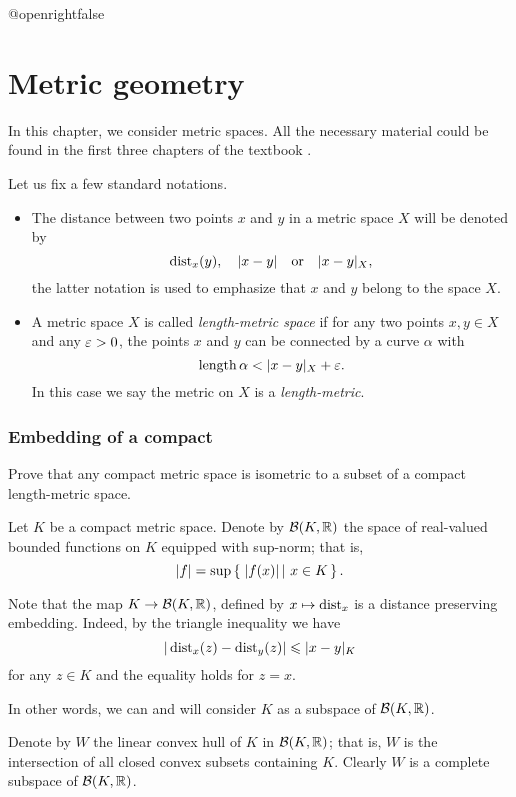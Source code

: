 \csname @openrightfalse\endcsname
\chapter{Metric geometry}

In this chapter, we consider metric spaces.
All the necessary material could be found in the first three chapters of the textbook \cite{bbi}. 

Let us fix a few standard notations.
\begin{itemize}
\item The distance between two points $x$ and $y$ in a metric space $X$
will be denoted by 
\[\operatorname{\rm dist}\nolimits_x(y),
\quad
|x-y|
\quad\text{or}\quad
|x-y|_X,
\]
the latter notation is used to emphasize that $x$ and $y$ belong to the space $X$.
\item A metric space $X$ is called {}\emph{length-metric space} if for any two points $x,y\in X$ and any $\varepsilon>0$, the points $x$ and $y$ can be connected by a curve $\alpha$
with
\[\length\alpha<|x-y|_X+\eps.\]
In this case we say the metric on $X$ is a \emph{length-metric}.
\end{itemize}

\subsection*{Embedding of a compact}
\label{compact} 

\begin{pr}
Prove that any compact metric space 
is isometric to 
a subset of a compact length-metric space.
\end{pr}

Let $K$ be a compact metric space.
Denote by $\mathcal{B}(K,\mathbb{R})$ the space of real-valued bounded functions on $K$
equipped with sup-norm; 
that is, 
\[|f|=\sup\set{|f(x)|}{x\in K}.\]

Note that the map $K\to \mathcal{B}(K,\mathbb{R})$, defined by $x\mapsto \operatorname{\rm dist}\nolimits_x$
is a distance preserving embedding.
Indeed, by the triangle inequality we have
\[|\operatorname{\rm dist}\nolimits_x(z)-\operatorname{\rm dist}\nolimits_y(z)|\leqslant |x-y|_K\]
for any $z\in K$
and the equality holds for $z=x$.

In other words, we can and will consider $K$ as a subspace of $\mathcal{B}(K,\mathbb{R})$.

Denote by $W$ the linear convex hull of $K$ in $\mathcal{B}(K,\mathbb{R})$;
that is, $W$ is the intersection of all closed convex subsets containing $K$. 
Clearly $W$ is a complete subspace of $\mathcal{B}(K,\mathbb{R})$.

